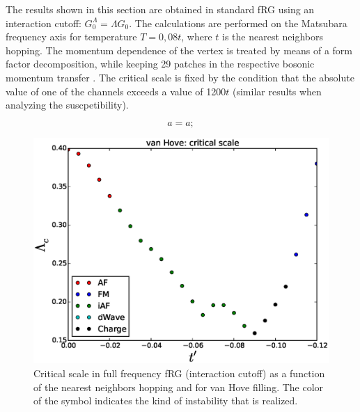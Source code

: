 The results shown in this section are obtained in standard fRG using an interaction cutoff: $G_0^\Lambda = \Lambda G_0$. The calculations are performed on the Matsubara frequency axis for temperature $T=0,08 t$, where $t$ is the nearest neighbors hopping.  
The momentum dependence of the vertex is treated by means of a form factor decomposition, while keeping 29 patches in the respective bosonic momentum transfer . The critical scale is fixed by the condition that the absolute value of one of the channels exceeds a value of 1200$t$ (similar results when analyzing the suscpetibility). 
 

\begin{equation}
\label{sdmft}
a = a ;  
\end{equation}


\begin{figure}
\includegraphics[scale=0.4]{vanHove_scan_critical_lambda_phi.eps}
\caption{Critical scale in full frequency fRG (interaction cutoff) as a function of the nearest neighbors hopping and for van Hove filling. The color of the symbol indicates the kind of instability that is realized.  } \label{dictionary}

\end{figure}

